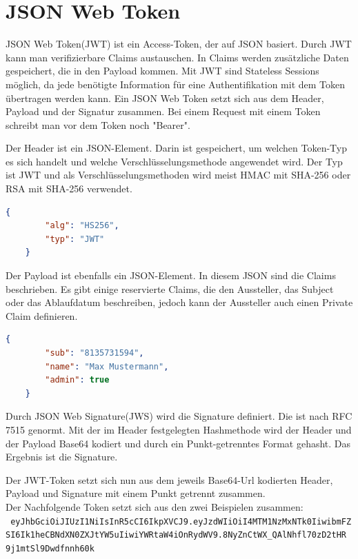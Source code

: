 \section{JSON Web Token}
JSON Web Token(JWT) ist ein Access-Token, der auf JSON basiert. Durch JWT kann man verifizierbare Claims austauschen. In Claims werden zusätzliche Daten gespeichert, die in den Payload kommen. Mit JWT sind Stateless Sessions möglich, da jede benötigte Information für eine Authentifikation mit dem Token übertragen werden kann. Ein JSON Web Token setzt sich aus dem Header, Payload und der Signatur zusammen. Bei einem Request mit einem Token schreibt man vor dem Token noch "Bearer". \autocite{wikiJWT}

Der Header ist ein JSON-Element. Darin ist gespeichert, um welchen Token-Typ es sich handelt und welche Verschlüsselungsmethode angewendet wird. Der Typ ist JWT und als Verschlüsselungsmethoden wird meist HMAC mit SHA-256 oder RSA mit SHA-256 verwendet. \autocite{wikiJWT} \\
\begin{lstlisting}[caption={JWT-Header Beispiel}, language=json]
	{
		"alg": "HS256",
		"typ": "JWT"
	}
\end{lstlisting}

Der Payload ist ebenfalls ein JSON-Element. In diesem JSON sind die Claims beschrieben. Es gibt einige reservierte Claims, die den Aussteller, das Subject oder das Ablaufdatum beschreiben, jedoch kann der Aussteller auch einen Private Claim definieren. \autocite{wikiJWT} \\
\begin{lstlisting}[caption={JWT-Payload Beispiel}, language=json]
	{
		"sub": "8135731594",
		"name": "Max Mustermann",
		"admin": true
	}
\end{lstlisting}

Durch JSON Web Signature(JWS) wird die Signature definiert. Die ist nach RFC 7515 genormt. Mit der im Header festgelegten Hashmethode wird der Header und der Payload Base64 kodiert und durch ein Punkt-getrenntes Format gehasht. Das Ergebnis ist die Signature. \autocite{wikiJWT}

Der JWT-Token setzt sich nun aus dem jeweils Base64-Url kodierten Header, Payload und Signature mit einem Punkt getrennt zusammen. \autocite{wikiJWT} \\
Der Nachfolgende Token setzt sich aus den zwei Beispielen zusammen:\\
\texttt{
	eyJhbGciOiJIUzI1NiIsInR5cCI6IkpXVCJ9.eyJzdWIiOiI4MTM1NzMxNTk0IiwibmFZ\\SI6Ik1heCBNdXN0ZXJtYW5uIiwiYWRtaW4iOnRydWV9.8NyZnCtWX\_QAlNhfl70zD2tHR\\9j1mtSl9Dwdfnnh60k
}

